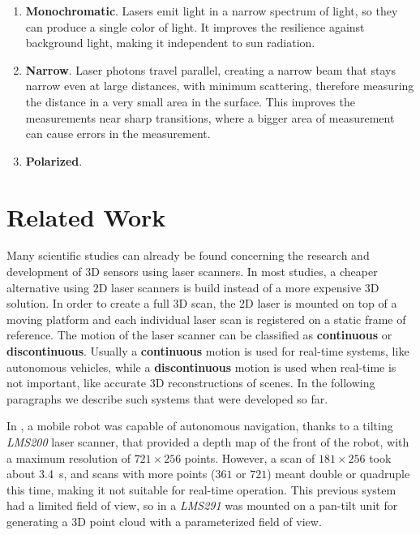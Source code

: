 \begin{enumerate}
    \item \textbf{Monochromatic}. Lasers emit light in a narrow spectrum of light, so they can produce a single color of light. It improves the resilience against background light, making it independent to sun radiation.
    \item \textbf{Narrow}. Laser photons travel parallel, creating a narrow beam that stays narrow even at large distances, with minimum scattering, therefore measuring the distance in a very small area in the surface. This improves the measurements near sharp transitions, where a bigger area of measurement can cause errors in the measurement. 
    \item \textbf{Polarized}. 
\end{enumerate}



\section{Related Work}

Many scientific studies can already be found concerning the research and development of 3D sensors using laser scanners. In most studies, a cheaper alternative using 2D laser scanners is build instead of a more expensive 3D solution. In order to create a full 3D scan, the 2D laser is mounted on top of a moving platform and each individual laser scan is registered on a static frame of reference. The motion of the laser scanner can be classified as \textbf{continuous} or \textbf{discontinuous}. Usually a \textbf{continuous} motion is used for real-time systems, like autonomous vehicles, while a \textbf{discontinuous} motion is used when real-time is not important, like accurate 3D reconstructions of scenes. In the following paragraphs we describe such systems that were developed so far.

In \cite{surmann2003}, a mobile robot was capable of autonomous navigation, thanks to a tilting \textit{LMS200} laser scanner, that provided a depth map of the front of the robot, with a maximum resolution of $721\times256$ points. However, a scan of $181\times256$ took about \SI{3.4}{\second}, and scans with more points ($361$ or $721$) meant double or quadruple this time, making it not suitable for real-time operation. This previous system had a limited field of view, so in \cite{zcai05} a \textit{LMS291} was mounted on a pan-tilt unit for generating a 3D point cloud with a parameterized field of view.

